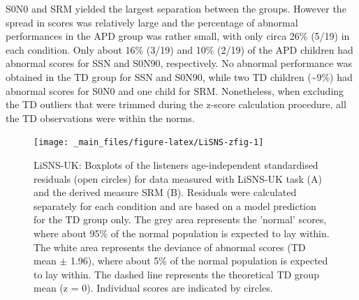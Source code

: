 \documentclass[a4paper, twoside]{templates/ociamthesis}
\begin{document}
S0N0 and SRM yielded the largest separation between the groups. However the spread in scores was relatively large and the percentage of abnormal performances in the APD group was rather small, with only circa 26\% (5/19) in each condition. Only about 16\% (3/19) and 10\% (2/19) of the APD children had abnormal scores for SSN and S0N90, respectively. No abnormal performance was obtained in the TD group for SSN and S0N90, while two TD children (\textasciitilde9\%) had abnormal scores for S0N0 and one child for SRM. Nonetheless, when excluding the TD outliers that were trimmed during the z-score calculation procedure, all the TD observations were within the norms.\\

\begin{figure}

{\centering \texttt{[image: \_main\_files/figure-latex/LiSNS-zfig-1]} 

}

\caption{LiSNS-UK: Boxplots of the listeners age-independent standardised residuals (open circles) for data measured with LiSNS-UK task (A) and the derived measure SRM (B). Residuals were calculated separately for each condition and are based on a model prediction for the TD group only. The grey area represents the 'normal' scores, where about 95\% of the normal population is expected to lay within. The white area represents the deviance of abnormal scores (TD mean $\pm$ 1.96), where about 5\% of the normal population is expected to lay within. The dashed line represents the theoretical TD group mean (z = 0). Individual scores are indicated by circles.}\label{fig:LiSNS-zfig}
\end{figure}

\begin{table}

\caption{\label{tab:LiSNS-ztab}LiSNS-UK standard residuals (z-scores) descriptives by group. Abnormal: defined as the percentage of z-scores $>$ 1.96 (SSN, S0N0, \& S0N90) and z-scores $<$ 1.96 (SRM).}
\centering
{}
\end{table}
\end{document}
